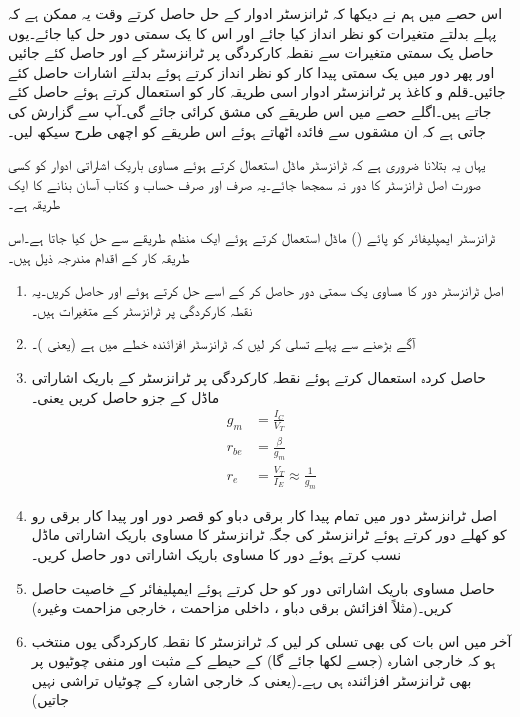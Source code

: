 اس حصے میں ہم نے دیکھا کہ ٹرانزسٹر ادوار کے حل حاصل کرتے وقت یہ ممکن ہے کہ پہلے بدلتے متغیرات کو نظر انداز کیا جائے اور اس کا یک سمتی دور حل کیا جائے۔یوں حاصل یک سمتی متغیرات سے نقطہ کارکردگی پر ٹرانزسٹر کے  اور  حاصل کئے جائیں اور پھر دور میں یک سمتی پیدا کار کو نظر انداز کرتے ہوئے بدلتے اشارات حاصل کئے جائیں۔قلم و کاغذ پر ٹرانزسٹر ادوار اسی طریقہ کار کو استعمال کرتے ہوئے حاصل کئے جاتے ہیں۔اگلے حصے میں اس طریقے کی مشق کرائی جائے گی۔آپ سے گزارش کی جاتی ہے کہ ان مشقوں سے فائدہ اٹھاتے ہوئے اس طریقے کو اچھی طرح سیکھ لیں۔

یہاں یہ بتلانا ضروری ہے کہ ٹرانزسٹر ماڈل استعمال کرتے ہوئے مساوی باریک اشاراتی ادوار کو کسی صورت اصل ٹرانزسٹر کا دور نہ سمجھا جائے۔یہ صرف اور صرف حساب و کتاب آسان بنانے کا ایک طریقہ ہے۔

ٹرانزسٹر ایمپلیفائر کو پائے () ماڈل استعمال کرتے ہوئے ایک منظم طریقے سے حل کیا جاتا ہے۔اس طریقہ کار کے اقدام مندرجہ ذیل ہیں۔
\begin{enumerate}
\item
اصل ٹرانزسٹر دور کا مساوی یک سمتی دور حاصل کر کے اسے حل کرتے ہوئے  اور   حاصل کریں۔یہ نقطہ کارکردگی پر ٹرانزسٹر کے متغیرات ہیں۔
\item
آگے بڑھنے سے پہلے تسلی کر لیں کہ ٹرانزسٹر افزائندہ خطے میں ہے (یعنی )۔  
\item
حاصل کردہ  استعمال کرتے ہوئے نقطہ کارکردگی پر ٹرانزسٹر کے باریک 	
اشاراتی ماڈل کے جزو حاصل کریں یعنی۔
\begin{align*}
g_m &=\frac{I_C}{V_T}\\
r_{be}&=\frac{\beta}{g_m}\\
r_e&=\frac{V_T}{I_E} \approx \frac{1}{g_m}
\end{align*}

\item
اصل ٹرانزسٹر دور  میں تمام پیدا کار برقی دباو کو قصر دور اور پیدا کار برقی رو کو کھلے دور کرتے ہوئے ٹرانزسٹر کی جگہ ٹرانزسٹر کا مساوی باریک اشاراتی ماڈل 	نسب کرتے ہوئے دور کا مساوی باریک اشاراتی دور حاصل کریں۔
\item
حاصل مساوی باریک اشاراتی دور کو حل کرتے ہوئے ایمپلیفائر کے خاصیت 	حاصل کریں۔(مثلاً افزائش برقی دباو ، داخلی مزاحمت  ، خارجی مزاحمت  وغیرہ)

\item
آخر میں اس بات کی بھی تسلی کر لیں کہ ٹرانزسٹر کا نقطہ کارکردگی یوں منتخب ہو کہ خارجی اشارہ (جسے   لکھا جائے گا) کے حیطے کے مثبت اور منفی چوٹیوں پر بھی ٹرانزسٹر افزائندہ ہی رہے۔(یعنی کہ خارجی اشارہ   کے چوٹیاں تراشی نہیں جاتیں)
\end{enumerate}
	

